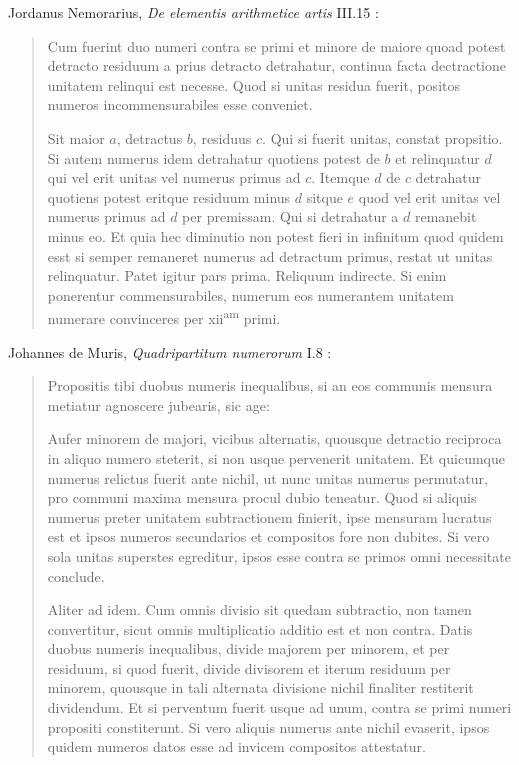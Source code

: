 \documentclass{article}
\begin{document}
Jordanus Nemorarius, {\em De elementis arithmetice artis} III.15 \cite[p.~88]{jordanus}:

\begin{quote}
Cum fuerint duo numeri contra se primi et minore de maiore quoad potest
detracto residuum a prius detracto detrahatur, continua facta dectractione
unitatem relinqui est necesse. Quod si unitas residua fuerit, positos numeros incommensurabiles esse conveniet.

Sit maior $a$, detractus $b$, residuus $c$. Qui si fuerit unitas, constat propsitio. Si
autem numerus idem detrahatur quotiens potest de $b$ et relinquatur $d$ qui vel erit
unitas vel numerus primus ad $c$. Itemque $d$ de $c$ detrahatur quotiens potest
eritque residuum minus $d$ sitque $e$ quod vel erit unitas vel numerus primus ad
$d$ per premissam. Qui si detrahatur a $d$ remanebit minus eo. Et quia hec
diminutio non potest fieri in infinitum quod quidem esst si semper remaneret
numerus ad detractum primus, restat ut unitas relinquatur. Patet igitur pars
prima. Reliquum indirecte. Si enim ponerentur commensurabiles, numerum
eos numerantem unitatem numerare convinceres per xii\textsuperscript{am} primi.
\end{quote}





Johannes de Muris, {\em Quadripartitum numerorum} I.8 \cite[pp.~154--155]{huillier}:

\begin{quote}
Propositis tibi duobus numeris inequalibus, si an eos communis
mensura metiatur agnoscere jubearis, sic age:

Aufer minorem de majori, vicibus alternatis, quousque detractio
reciproca in aliquo numero steterit, si non usque pervenerit
unitatem. Et quicumque numerus relictus fuerit ante nichil, ut
nunc unitas numerus permutatur, pro communi maxima mensura
procul dubio teneatur. Quod si aliquis numerus preter unitatem
subtractionem finierit, ipse mensuram lucratus est et ipsos
numeros secundarios et compositos fore non dubites. Si vero
sola unitas superstes egreditur, ipsos esse contra se primos omni
necessitate conclude.

Aliter ad idem. Cum omnis divisio sit quedam subtractio,
non tamen convertitur, sicut omnis multiplicatio additio est
et non contra. Datis duobus numeris inequalibus, divide majorem
per minorem, et per residuum, si quod fuerit, divide divisorem
et iterum residuum per minorem, quousque in tali alternata
divisione nichil finaliter restiterit dividendum. Et si perventum
fuerit usque ad unum, contra se primi numeri propositi constiterunt.
Si vero aliquis numerus ante nichil evaserit, ipsos
quidem numeros datos esse ad invicem compositos attestatur.
\end{quote}
\end{document}
